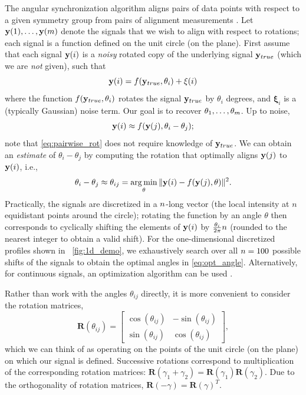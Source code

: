 The angular synchronization algorithm aligns pairs of data points with respect to a given symmetry group from pairs of alignment measurements \citep{singer2011angular}. 
%
Let $ \mathbf{y}(1), \dots, \mathbf{y}(m)$ denote the signals that we wish to align with respect to rotations;
each signal is a function defined on the unit circle (on the plane).
%
First assume that each signal $\mathbf{y}(i)$ is a {\it noisy} rotated copy of the underlying signal $\mathbf{y}_{true}$
(which we are {\it not} given), such that
\begin{equation}
\mathbf{y}(i) = f(\mathbf{y}_{true}, \theta_i) + \mathbf{\xi}(i)
\end{equation}
where the function $f(\mathbf{y}_{true}, \theta_i)$ rotates the signal $\mathbf{y}_{true}$ by $\theta_i$ degrees, and $\mathbf{\xi}_i$ is a (typically Gaussian) noise term.
%
Our goal is to recover $\theta_1, \dots, \theta_m$.
%
Up to noise,
\begin{equation} \label{eq:pairwise_rot}
\mathbf{y}(i) \approx f(\mathbf{y}(j), \theta_i - \theta_j) ;
\end{equation}
note that \eqref{eq:pairwise_rot} does not require knowledge of $\mathbf{y}_{true}$.
%
We can obtain an {\it estimate} of $\theta_i - \theta_j$ by computing the rotation that optimally aligns $\mathbf{y}(j)$ to $\mathbf{y}(i)$,
i.e., %
%
\begin{equation} \label{eq:opt_angle}
\theta_i - \theta_j \approx \theta_{ij} = \operatorname*{arg\,min}_{\theta} \|\mathbf{y}(i) - f(\mathbf{y}(j), \theta)\|^2.
\end{equation}
%
Practically, the signals are discretized in a $n$-long vector (the local intensity at $n$ equidistant points around the circle);
rotating the function by an angle $\theta$ then corresponds to cyclically shifting the elements of $\mathbf{y}(i)$
by $\frac{\theta_i}{2 \pi} n$ (rounded to the nearest integer to obtain a valid shift).
%
For the one-dimensional discretized profiles shown in \fig~\ref{fig:1d_demo}, we exhaustively search over all $n=100$ possible shifts of the signals to obtain the optimal angles in \eqref{eq:opt_angle}.
%
Alternatively, for continuous signals, an optimization algorithm
can be used \citep{ahuja2007template}.

Rather than work with the angles $\theta_{ij}$ directly, it is more convenient to consider the rotation matrices,
\begin{equation} \label{eq:R_theta}
\mathbf{R}(\theta_{ij}) = \begin{bmatrix}
\cos(\theta_{ij}) & -\sin(\theta_{ij}) \\
\sin(\theta_{ij}) & \cos(\theta_{ij})
\end{bmatrix},
\end{equation}
which we can think of as operating on the points of the unit circle (on the plane) on which our signal is defined.
%
Successive rotations correspond to multiplication of the corresponding rotation matrices: $\mathbf{R}(\gamma_1 + \gamma_2) = \mathbf{R}(\gamma_1) \mathbf{R}(\gamma_2)$.
%
Due to the orthogonality of rotation matrices, $\mathbf{R}(-\gamma) = \mathbf{R}(\gamma)^T$.


